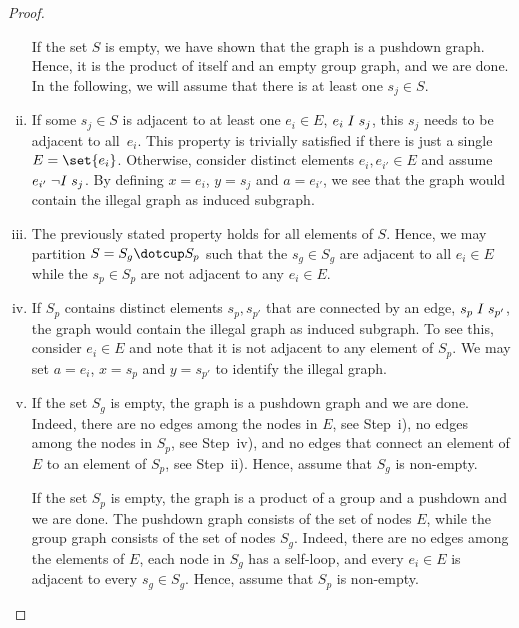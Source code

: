 \documentclass[../../diss.tex]{subfiles}
\begin{document}
\begin{proof}
\begin{enumerate}[i)]
            If the set $S$ is empty, we have shown that the graph is a pushdown graph.
            Hence, it is the product of itself and an empty group graph, and we are done.
            In the following, we will assume that there is at least one $s_j \in S$.
        \item
            If some $s_j \in S$ is adjacent to at least one $e_i \in E$, $e_i \mathrel{I} s_j$, this $s_j$ needs to be adjacent to all~$e_i$.
            This property is trivially satisfied if there is just a single $E = \set{e_i}$.
            Otherwise, consider distinct elements $e_i, e_{i'} \in E$ and assume $e_{i'} \mathrel{\neg I} s_j$.
            By defining $x = e_i$, $y = s_j$ and $a = e_{i'}$, we see that the graph would contain the  illegal graph  as induced subgraph.
        \item
            The previously stated property holds for all elements of $S$.
            Hence, we may partition $S = S_g \dotcup S_p$ such that the $s_g \in S_g$ are adjacent to all $e_i \in E$ while the $s_p \in S_p$ are not adjacent to any $e_i \in E$.
        \item
            If $S_p$ contains distinct elements $s_p, s_{p'}$ that are connected by an edge, $s_p \mathrel{I} s_{p'}$, the graph would contain the  illegal graph as induced subgraph.
            To see this, consider $e_i \in E$  and note that it is not adjacent to any element of $S_p$.
            We may set $a = e_i$, $x = s_p$ and $y = s_{p'}$ to identify the  illegal graph.
        \item
            If the set $S_g$ is empty, the graph is a pushdown graph and we are done.
            Indeed, there are no edges among the nodes in $E$, see Step~i), no edges among the nodes in $S_p$, see Step~iv), and no edges that connect an element of $E$ to an element of $S_p$, see Step~ii).
            Hence, assume that $S_g$ is non-empty.

            If the set $S_p$ is empty, the graph is a product of a group and a pushdown and we are done.
            The pushdown graph consists of the set of nodes $E$, while the group graph consists of the set of nodes $S_g$.
            Indeed, there are no edges among the elements of $E$, each node in $S_g$ has a self-loop, and every $e_i \in E$ is adjacent to every $s_g \in S_g$.
            Hence, assume that $S_p$ is non-empty.


\end{enumerate}
\end{proof}
\end{document}
